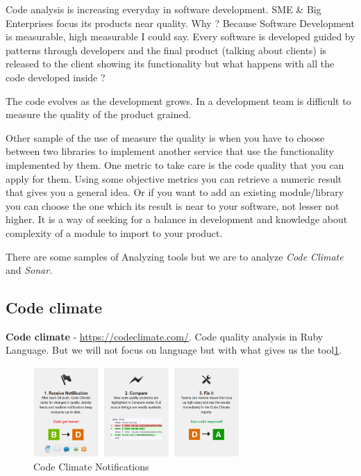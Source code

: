\documentclass[11pt]{scrartcl}
\begin{document}
\par Code analysis is increasing everyday in software development. SME \& Big Enterprises focus its products near quality. Why ? Because Software Development is measurable, high measurable I could say. Every software is developed guided by patterns through developers and the final product (talking about clients) is released to the client showing its functionality but what happens with all the code developed inside ?

\par The code evolves as the development grows. In a development team is difficult to measure the quality of the product grained.

\par Other sample of the use of measure the quality is when you have to choose between two libraries to implement another service that use the functionality implemented by them. One metric to take care is the code quality that you can apply for them. Using some objective metrics you can retrieve a numeric result that gives you a general idea. Or if you want to add an existing module/library you can choose the one which its result is near to your software, not lesser not higher. It is a way of seeking for a balance in development and knowledge about complexity of a module to import to your product.

\par There are some samples of Analyzing tools but we are to analyze \emph{Code Climate} and \emph{Sonar}.

\subsection{Code climate}
\label{sub:code-climate}

\textbf{Code climate} - \url{https://codeclimate.com/}. Code quality analysis in Ruby Language. But we will not focus on language but with what gives us the tool\ref{code-climate}.

\begin{figure}[H]
\centering
\includegraphics[width=0.7\textwidth]{code-climate.png}
\caption{Code Climate Notifications}
\label{code-climate}
\end{figure}
\end{document}
